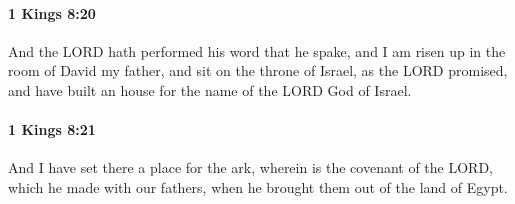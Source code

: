 		\paragraph{1 Kings 8:20} %
			\label{1KINGS-8-20}

			And the LORD hath performed his word that he spake, and I am risen up in the room of David my father, and sit on the throne of Israel, as the LORD promised, and have built an house for the name of the LORD God of Israel.


		\paragraph{1 Kings 8:21} %
			\label{1KINGS-8-21}

			And I have set there a place for the ark, wherein is the covenant of the LORD, which he made with our fathers, when he brought them out of the land of Egypt.

